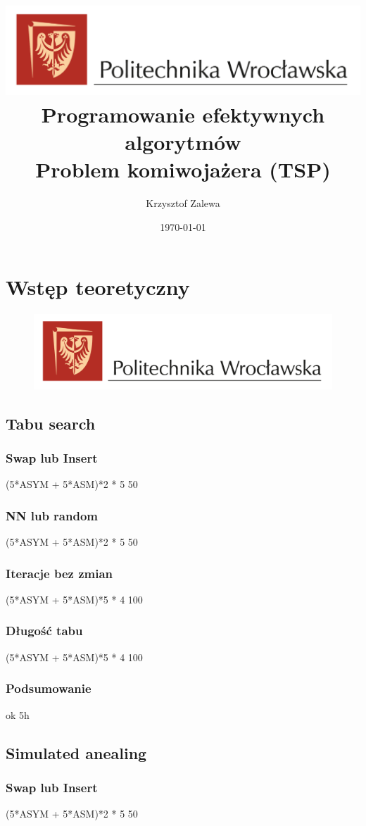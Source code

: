 \documentclass{article}
\title{
  \centering
  \includegraphics[width=\textwidth]{src/images/logo_PWr_kolor_poziom.png}\\
  \fontsize{28pt}{30pt}\selectfont Programowanie efektywnych algorytmów\\
  \fontsize{14pt}{30pt}\selectfont Problem komiwojażera (TSP)}
\author{Krzysztof Zalewa}
\date{\daymonthyear\today}
\begin{document}
    \maketitle
    \pagebreak
    \tableofcontents
    \FloatBarrier
    \section{Wstęp teoretyczny}
      \begin{figure}[ht]
        \centering
        \includegraphics[width=\textwidth]{src/images/logo_PWr_kolor_poziom.png}
        \caption{}
        \label{fig:tex2}
      \end{figure}
      \FloatBarrier
    \subsection{Tabu search}
      \subsubsection{Swap lub Insert} 
        (5*ASYM + 5*ASM)*2 * 5 50
      \subsubsection{NN lub random}
        (5*ASYM + 5*ASM)*2 * 5 50
      \subsubsection{Iteracje bez zmian}
        (5*ASYM + 5*ASM)*5 * 4 100
      \subsubsection{Długość tabu} 
        (5*ASYM + 5*ASM)*5 * 4 100
      \subsubsection{Podsumowanie}ok 5h
    \subsection{Simulated anealing}
      \subsubsection{Swap lub Insert}
        (5*ASYM + 5*ASM)*2 * 5 50
\end{document}
